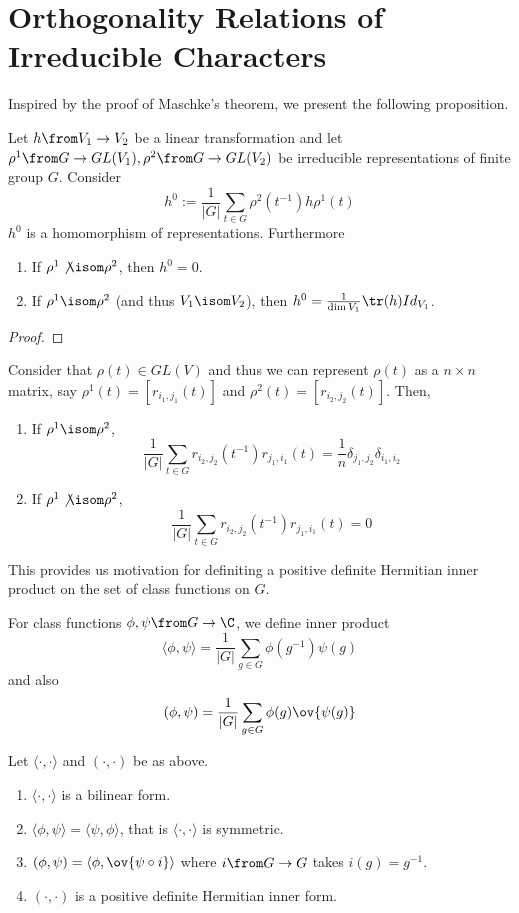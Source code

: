 \documentclass[11pt,leqno,oneside]{amsbook}
\numberwithin{thm}{section}
\begin{document}
\section{Orthogonality Relations of Irreducible Characters}
Inspired by the proof of Maschke's theorem, we present the following
proposition.
\begin{prop}
  Let \(h \from V_1 \to V_2\) be a linear transformation and let 
  \(\rho^1 \from G \to GL(V_1), \rho^2 \from G \to GL(V_2)\) be
  irreducible representations of finite group \(G\). Consider \[
    h^0 := \frac{1}{|G|} \sum_{t \in G} \rho^2(t^{-1}) h \rho^1(t)
  \]
  \(h^0\) is a homomorphism of representations. Furthermore
  \begin{enumerate}
  \item If \(\rho^1 \not \isom \rho^2\), then \(h^0 = 0\).
  \item If \(\rho^1 \isom \rho^2\) (and thus \(V_1 \isom V_2\)), then \(h^0 = \frac{1}{\dim V_1}
    \tr(h) Id_{V_1}\).
  \end{enumerate}
\end{prop}
\begin{proof}
\end{proof}
\begin{cor}
  Consider that \(\rho(t) \in GL(V)\) and thus we can represent
  \(\rho(t)\) as a \(n \times n\) matrix, say \(\rho^1(t) =
  [r_{i_1,j_1}(t)]\) and \(\rho^2(t) = [r_{i_2,j_2}(t)]\). Then,
  \begin{enumerate}
  \item If
  \(\rho^1 \isom \rho^2\), \[
    \frac{1}{|G|} \sum_{t \in G} r_{i_2,j_2}(t^{-1}) r_{j_1,i_1}(t) =
    \frac{1}{n} \delta_{j_1,j_2} \delta_{i_1,i_2}
  \]
\item If \(\rho^1 \not \isom \rho^2\), \[
  \frac{1}{|G|} \sum_{t \in G} r_{i_2,j_2}(t^{-1}) r_{j_1,i_1}(t) = 0
  \]
  \end{enumerate}
\end{cor}
This provides us motivation for definiting a positive definite
Hermitian inner product on the set of class functions on \(G\).
\begin{defn}
  For class functions \(\phi, \psi \from G \to \C\), we define inner
  product \[ 
    \langle \phi, \psi \rangle = \frac{1}{|G|} \sum_{g \in G}
    \phi(g^{-1}) \psi(g)
  \]
  and also \[
    (\phi,\psi) = \frac{1}{|G|} \sum_{g \in G} \phi(g) \ov{\psi(g)}
  \]
\end{defn}
\begin{prop}
  Let \(\langle \cdot, \cdot \rangle\) and \((\cdot, \cdot)\) be as
  above.
  \begin{enumerate}
  \item \(\langle \cdot, \cdot \rangle\) is a bilinear form.
  \item \(\langle \phi, \psi \rangle = \langle \psi, \phi \rangle\),
    that is \(\langle \cdot, \cdot \rangle\) is symmetric.
  \item \((\phi, \psi) = \langle \phi, \ov{\psi \circ i} \rangle\)
    where \(i \from G \to G\) takes \(i(g) = g^{-1}\).
  \item \((\cdot, \cdot)\) is a positive definite Hermitian inner form.
  \end{enumerate}
\end{prop}
\end{document}
